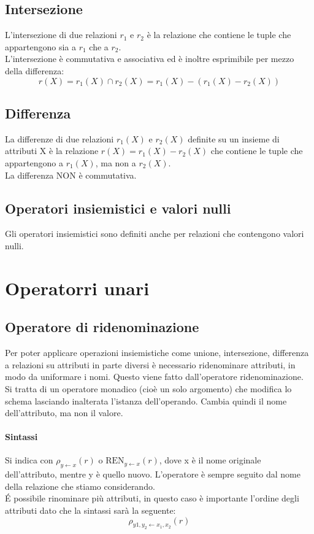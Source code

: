 \subsection*{Intersezione}
L'intersezione di due relazioni $r_1$ e $r_2$ è la relazione che contiene le tuple
che appartengono sia a $r_1$ che a $r_2$.\\
L'intersezione è commutativa e associativa ed è inoltre esprimibile per mezzo della
differenza:
\begin{equation*}
    r(X) = r_1(X) \cap r_2(X) = r_1(X) - (r_1(X) - r_2(X))
\end{equation*}
\subsection*{Differenza}
La differenze di due relazioni $r_1(X)$ e $r_2(X)$ definite su un insieme di attributi
X è la relazione $r(X) = r_1(X) - r_2(X)$ che contiene le tuple che appartengono a $r_1(X)$, ma
non a $r_2(X)$.\\
La differenza NON è commutativa.\\
\subsection*{Operatori insiemistici e valori nulli}
Gli operatori insiemistici sono definiti anche per relazioni che contengono valori nulli.\\
\section{Operatorri unari}
\subsection{Operatore di ridenominazione}
Per poter applicare operazioni insiemistiche come unione, intersezione, differenza a relazioni
su attributi in parte diversi è necessario ridenominare attributi, in modo da uniformare
i nomi. Questo viene fatto dall'operatore ridenominazione.\\
Si tratta di un operatore monadico (cioè un solo argomento) che modifica lo schema lasciando
inalterata l'istanza dell'operando. Cambia quindi il nome dell'attributo, ma non il valore.
\paragraph*{Sintassi} Si indica con $\rho_{y \leftarrow x}(r)$ o 
$\text{REN}_{y \leftarrow x}(r)$, dove x è
il nome originale dell'attributo, mentre y è quello nuovo. L'operatore è sempre seguito dal
nome della relazione che stiamo considerando.\\
\'E possibile rinominare più attributi, in questo caso è importante l'ordine degli attributi
dato che la sintassi sarà la seguente:
\begin{equation*}
    \rho_{y1, y_2 \leftarrow x_1, x_2}(r)
\end{equation*}
